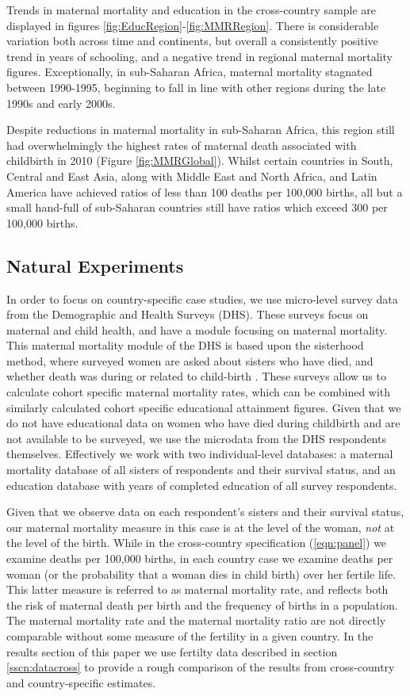 \documentclass{article}[12pt,subeqn]
\begin{document}
\begin{spacing}{1.4}
Trends in maternal mortality and education in the cross-country sample are displayed in figures 
\ref{fig:EducRegion}-\ref{fig:MMRRegion}.  There is considerable variation both across time and continents, 
but overall a consistently positive trend in years of schooling, and a negative trend in regional maternal 
mortality figures. Exceptionally, in sub-Saharan Africa, maternal mortality stagnated between 1990-1995, 
beginning to fall in line with other regions during the late 1990s and early 2000s.

Despite reductions in maternal mortality in sub-Saharan Africa, this region still had overwhelmingly the
highest rates of maternal death associated with childbirth in 2010 (Figure \ref{fig:MMRGlobal}). Whilst 
certain countries in South, Central and East Asia, along with Middle East and North Africa, and Latin America 
have achieved ratios of less than 100 deaths per 100,000 births, all but a small hand-full of sub-Saharan 
countries still have ratios which exceed 300 per 100,000 births.


\subsection{Natural Experiments}
\label{sscn:dataexp}
In order to focus on country-specific case studies, we use micro-level survey data from the Demographic
and Health Surveys (DHS). These surveys focus on maternal and child health, and have a module focusing
on maternal mortality. This maternal mortality module of the DHS is based upon the sisterhood method,
where surveyed women are asked about sisters who have died, and whether death was during or related to
child-birth \citep{RutsteinRojas2006}. These surveys allow us to calculate cohort specific maternal mortality
rates, which can be combined with similarly calculated cohort specific educational attainment figures. Given
that we do not have educational data on women who have died during childbirth and are not available to be
surveyed, we use the microdata from the DHS respondents themselves.  Effectively we work with
two individual-level databases: a maternal mortality database of all sisters of respondents and their
survival status, and an education database with years of completed education of all survey respondents.

Given that we observe data on each respondent's sisters and their survival status, our maternal mortality
measure in this case is at the level of the woman, \emph{not} at the level of the birth.  While in the
cross-country specification (\ref{eqn:panel}) we examine deaths per 100,000 births, in each country case
we examine deaths per woman (or the probability that a woman dies in child birth) over her fertile life.
This latter measure is referred to as maternal mortality rate, and reflects both the risk of maternal death
per birth and the frequency of births in a population.  The maternal mortality rate and the maternal 
mortality ratio are not directly comparable without some measure of the fertility in a given country.
In the results section of this paper we use fertilty data described in section \ref{sscn:datacross} to 
provide a rough comparison of the results from cross-country and country-specific estimates.


\end{spacing}
\end{document}
